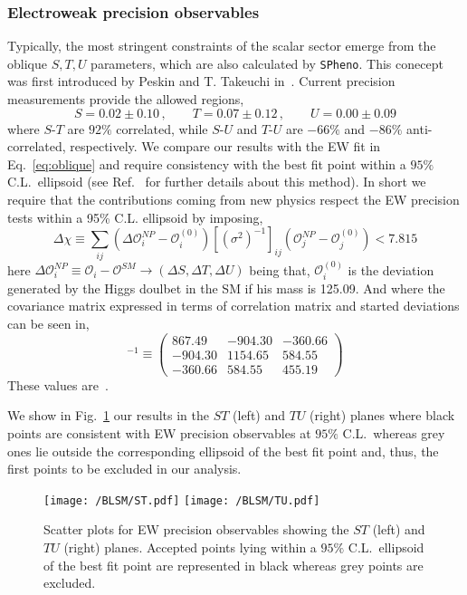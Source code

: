 \subsubsection{Electroweak precision observables}
\label{Sec:B-L-SM-EW}
Typically, the most stringent constraints of the scalar sector emerge from the oblique $S,T,U$ parameters, which are also calculated by \texttt{SPheno}. 
%
This conecept was first introduced by Peskin and T. Takeuchi in \,\cite{Peskin1992}.
%
Current precision measurements provide the allowed regions,
%
\begin{equation}
	S = 0.02 \pm 0.10\,, \qquad T = 0.07 \pm 0.12\,, \qquad U = 0.00 \pm 0.09
	\label{eq:oblique}
\end{equation}
%
where $S$-$T$ are $92\%$ correlated, while $S$-$U$ and $T$-$U$ are $-66\%$ and $-86\%$ anti-correlated, respectively.
%
We compare our results with the EW fit in Eq.~\eqref{eq:oblique} and require consistency with the best fit point within a $95\%$ C.L.~ellipsoid (see Ref.~\cite{Costa:2014qga} for further details about this method). %
%
In short we require that the contributions coming from new physics respect the EW precision tests within a 95\% C.L. ellipsoid by imposing, 
%
\begin{equation}
\Delta \chi \equiv \sum_{ij}  \left(  \Delta \mathcal{O}_{i}^{NP} - \mathcal{O}_{i}^{(0)} \right) [ ( \sigma^2 )^{-1} ]_{ij}  \left(  \mathcal{O}_{j}^{NP} - \mathcal{O}_{j}^{(0)}  \right) < 7.815    
\end{equation}
%
here $\Delta \mathcal{O}_i^{NP} \equiv \mathcal{O}_i - \mathcal{O}^{SM} \rightarrow (\Delta S , \Delta T , \Delta U )$ being that, $\mathcal{O}_i^{(0)}$ is the deviation generated by the Higgs doulbet in the SM if his mass is 125.09. And where the covariance matrix expressed in terms of correlation matrix and started deviations can be seen in, 
\begin{equation}
[ \sigma^2 ]^{-1} \equiv \begin{pmatrix}
867.49 & −904.30 & -360.66\\
−904.30 & 1154.65 & 584.55 \\
−360.66 & 584.55 &  455.19
\end{pmatrix}  
\end{equation}
These values are \,\cite{Baak_2012}. 

We show in Fig.~\ref{fig:STU} our results in the $ST$ (left) and $TU$ (right) planes where black points are consistent with EW precision observables at $95\%$ C.L.~whereas grey ones lie outside the corresponding ellipsoid of the best fit point and, thus, the first points to be excluded in our analysis. 
\begin{figure}[H]
	\centering
	\texttt{[image: /BLSM/ST.pdf]}
	\texttt{[image: /BLSM/TU.pdf]}
	\caption{Scatter plots for EW precision observables showing the $ST$ (left) and $TU$ (right) planes. Accepted points lying within a $95\%$ C.L.~ellipsoid of the best fit point are represented in black whereas grey points are excluded.}
	\label{fig:STU}
\end{figure}	

